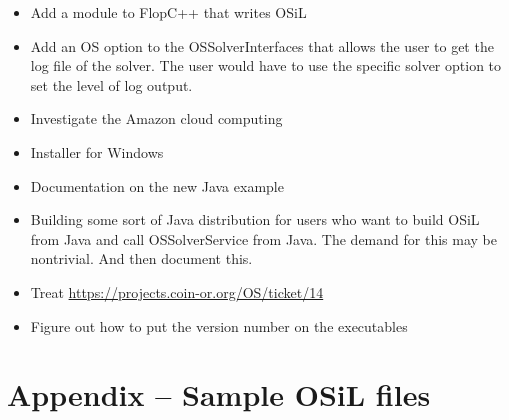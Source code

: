 \documentclass[11pt]{article}
\newcounter{Fig}
\renewcommand{\_}{{\char"5F}}
\renewcommand{\{}{{\char"7B}}
\renewcommand{\}}{{\char"7D}}
\renewcommand{\^}{{\char"0D}}
\renewcommand{\'}{{\char"0D}}
\begin{document}
\begin{enumerate}[Step 1:]
\begin{itemize}
\item Add a module to FlopC++ that writes OSiL

\item Add an OS option to the OSSolverInterfaces that allows the user to get the log file of the solver. The user would have to use the specific solver option to set the level of log output.

\item Investigate the Amazon cloud computing

\item Installer for Windows

\item Documentation on the new Java example 

\item  Building some sort of Java distribution for users who want to build OSiL from Java and call OSSolverService from Java. The demand for this may be nontrivial.  And then document this.

\item  Treat \url{https://projects.coin-or.org/OS/ticket/14} 

\item Figure out how to put the version number on the executables

\end{itemize}

\section{Appendix -- Sample OSiL files}\label{section:appendix}


\end{enumerate}
\end{document}
